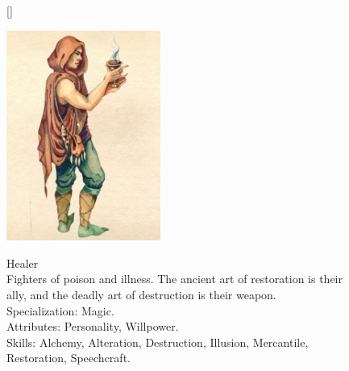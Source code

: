 \documentclass[12pt]{book}
\begin{document}
\begin{figure}[H]
[\FBwidth]
{\caption*{Healer\\

Fighters of poison and illness. The ancient art of restoration is their ally, and the deadly art of destruction is their weapon.\\

Specialization: Magic.\\

Attributes: Personality, Willpower.\\

Skills: Alchemy, Alteration, Destruction, Illusion, Mercantile, Restoration, Speechcraft.}\label{fig:test}}
{\includegraphics[width=0.45\textwidth]{Healer.png}}
\end{figure}
\end{document}
